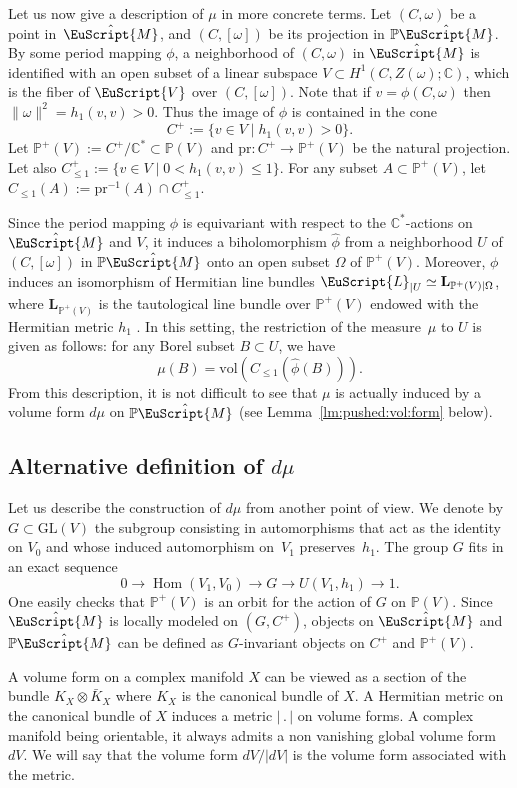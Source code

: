\documentclass[JEP,XML,SOM,Unicode]{cedram}
\let\mathcal\EuScript
\DeclareMathOperator{\Hom}{Hom}
\theoremstyle{plain}
\theoremstyle{definition}
\def\C{\mathbb{C}}
\newcommand{\Pb}{\mathbb{P}}
\newcommand{\Lb}{\mathbf{L}}
\newcommand{\cL}{\mathcal{L}}
\newcommand{\cM}{\mathcal{M}}
\newcommand{\cV}{\mathcal{V}}
\newcommand{\GL}{\mathrm{GL}}
\newcommand{\vol}{\mathrm{vol}}
\newcommand{\pr}{\mathrm{pr}}
\let\omg\omega
\begin{document}
Let us now give a description of $\mu$ in more concrete terms.
Let $(C,\omega)$ be a point in~$\hat{\cM}$, and $(C,[\omg])$ be its projection in $\Pb\hat{\cM}$.
By some period mapping $\phi$, a neighborhood of $(C,\omg)$ in $\hat{\cM}$ is identified with an open subset of a linear subspace $V \subset H^1(C,Z(\omg);\C)$, which is the fiber of $\cV$ over $(C,[\omega])$.
Note that if $v=\phi(C,\omg)$ then $\|\omg\|^2=h_1(v,v) >0$. Thus the image of $\phi$ is contained in the cone
\[
C^+:=\{v\in V\mid h_1(v,v)>0\}.
\]
Let $\Pb^+(V):= C^+/\C^* \subset\Pb(V)$ and $\pr : C^+ \to \Pb^+(V) $ be the natural projection.
Let also $C^+_{\leq 1} := \{ v \in V \mid 0 < h_1(v,v) \leq 1 \}$.
For any subset $A\subset \Pb^+(V)$, let $C_{\leq 1}(A):=\pr^{-1}(A)\cap C^+_{\leq 1}$.

Since the period mapping $\phi$ is equivariant with respect to the $\C^*$-actions on $\hat{\cM}$ and $V$, it induces a biholomorphism $\hat{\phi}$ from a neighborhood $U$ of $(C,[\omg])$ in $\Pb\hat{\cM}$ onto an open subset $\Omega$ of $\Pb^+(V)$.
Moreover, $\phi$ induces an isomorphism of Hermitian line bundles $\cL_{|U}\simeq \Lb_{\Pb^+(V)|\Omega}$, where $\Lb_{\Pb^+(V)}$ is the tautological line bundle over $\Pb^+(V)$ endowed with the Hermitian metric $h_1$ .
In this setting, the restriction of the measure~$\mu$ to $U$ is given as follows: for any Borel subset $B\subset U$, we have
\[ \mu(B)=\vol(C_{\leq 1}(\hat{\phi}(B))). \]
From this description, it is not difficult to see that $\mu$ is actually induced by a volume form $d\mu$ on $\Pb\hat\cM$ (see Lemma~\ref{lm:pushed:vol:form} below).

\subsection{Alternative definition of $d\mu$}\label{sec:defvolform}
Let us describe the construction of $d\mu$ from another point of view.
We denote by $G \subset \GL(V)$ the subgroup consisting in automorphisms that act as the identity on $V_0$ and whose induced automorphism on~$V_1$ preserves~$h_1$.
The group $G$ fits in an exact sequence
\[
0 \to \Hom(V_1, V_0) \to G \to U(V_1, h_1) \to 1.
\]
One easily checks that $\Pb^+(V) $ is an orbit for the action of $G$ on $\Pb(V)$.
Since $\hat\cM$ is locally modeled on $(G,C^+)$, objects on $\hat\cM$ and $\Pb\hat\cM$ can be defined as $G$-invariant objects on $C^+$ and $\Pb^+(V)$.

A volume form on a complex manifold $X$ can be viewed as a section of the bundle $K_X\otimes\bar K_X$ where $K_X$ is the canonical bundle of $X$. A Hermitian metric on the canonical bundle of $X$ induces a metric $|\,.\,|$ on volume forms. A complex manifold being orientable, it always admits a non vanishing global volume form $dV$. We will say that the volume form $dV/|dV|$ is the volume form associated with the metric.
\end{document}
